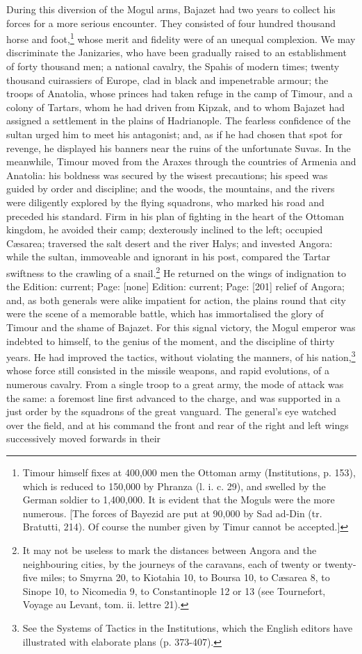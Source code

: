 During this diversion of the Mogul arms, Bajazet had two years to collect his forces for a more serious encounter. They consisted of four hundred thousand horse and foot,\footnote{Timour himself fixes at 400,000 men the Ottoman army (Institutions, p. 153), which is reduced to 150,000 by Phranza (l. i. c. 29), and swelled by the German soldier to 1,400,000. It is evident that the Moguls were the more numerous. [The forces of Bayezid are put at 90,000 by Sad ad-Din (tr. Bratutti, 214). Of course the number given by Timur cannot be accepted.]} whose merit and fidelity were of an unequal complexion. We may discriminate the Janizaries, who have been gradually raised to an establishment of forty thousand men; a national cavalry, the Spahis of modern times; twenty thousand cuirassiers of Europe, clad in black and impenetrable armour; the troops of Anatolia, whose princes had taken refuge in the camp of Timour, and a colony of Tartars, whom he had driven from Kipzak, and to whom Bajazet had assigned a settlement in the plains of Hadrianople. The fearless confidence of the sultan urged him to meet his antagonist; and, as if he had chosen that spot for revenge, he displayed his banners near the ruins of the unfortunate Suvas. In the meanwhile, Timour moved from the Araxes through the countries of Armenia and Anatolia: his boldness was secured by the wisest precautions; his speed was guided by order and discipline; and the woods, the mountains, and the rivers were diligently explored by the flying squadrons, who marked his road and preceded his standard. Firm in his plan of fighting in the heart of the Ottoman kingdom, he avoided their camp; dexterously inclined to the left; occupied Cæsarea; traversed the salt desert and the river Halys; and invested Angora: while the sultan, immoveable and ignorant in his post, compared the Tartar swiftness to the crawling of a snail.\footnote{It may not be useless to mark the distances between Angora and the neighbouring cities, by the journeys of the caravans, each of twenty or twenty-five miles; to Smyrna 20, to Kiotahia 10, to Boursa 10, to Cæsarea 8, to Sinope 10, to Nicomedia 9, to Constantinople 12 or 13 (see Tournefort, Voyage au Levant, tom. ii. lettre 21).} He returned on the wings of indignation to the Edition: current; Page: [none] Edition: current; Page: [201] relief of Angora; and, as both generals were alike impatient for action, the plains round that city were the scene of a memorable battle, which has immortalised the glory of Timour and the shame of Bajazet. For this signal victory, the Mogul emperor was indebted to himself, to the genius of the moment, and the discipline of thirty years. He had improved the tactics, without violating the manners, of his nation,\footnote{See the Systems of Tactics in the Institutions, which the English editors have illustrated with elaborate plans (p. 373-407).} whose force still consisted in the missile weapons, and rapid evolutions, of a numerous cavalry. From a single troop to a great army, the mode of attack was the same: a foremost line first advanced to the charge, and was supported in a just order by the squadrons of the great vanguard. The general\texthebrew{}’s eye watched over the field, and at his command the front and rear of the right and left wings successively moved forwards in their 